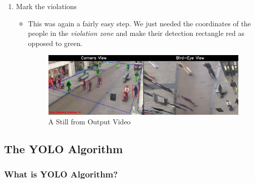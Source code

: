 \documentclass[a4paper]{article}
\begin{document}
\begin{enumerate}
    \item Mark the violations
          \begin{itemize}[label={}]
              \item This was again a fairly easy step. We just needed the coordinates of the people in the \textit{violation zone} and make their detection rectangle red as opposed to green.
              
              \begin{figure}[h!]
                  \centering
                  \includegraphics[width=\linewidth]{Pictures/sample output0.png}
                  \caption{A Still from Output Video}
                  \label{fig:OutputVid}
              \end{figure}
          \end{itemize}
\end{enumerate}
\pagebreak
\subsection{The YOLO Algorithm}

\subsubsection{What is YOLO Algorithm?}
\end{document}
